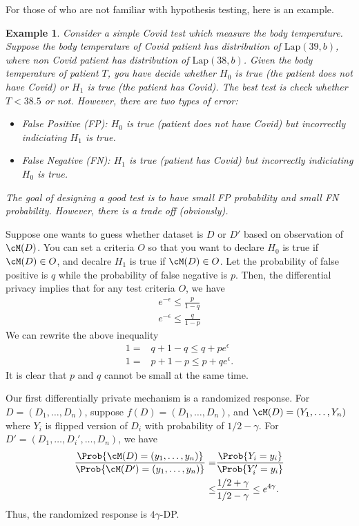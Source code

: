 \documentclass[11pt, a4paper]{article}
\newtheorem{example}{Example}
\begin{document}
For those of who are not familiar with hypothesis testing, here is an example.
\begin{example}
    Consider a simple Covid test which measure the body temperature.
    Suppose the body temperature of Covid patient has distribution of $\mbox{Lap}(39, b)$,
    where non Covid patient has distribution of $\mbox{Lap}(38, b)$.
    Given the body temperature of patient $T$, you have decide whether $H_0$ is true (the patient does not have Covid) or $H_1$ is true (the patient has Covid).
    The best test is check whether $T<38.5$ or not.
    However, there are two types of error:
    \begin{itemize}
        \item False Positive (FP): $H_0$ is true (patient does not have Covid) but incorrectly indiciating $H_1$ is true.
        \item False Negative (FN): $H_1$ is true (patient has Covid) but incorrectly indiciating $H_0$ is true.
    \end{itemize}
    The goal of designing a good test is to have small FP probability and small FN probability.
    However, there is a trade off (obviously).
\end{example}
Suppose one wants to guess whether dataset is $D$ or $D'$ based on observation of $\cM(D)$.
You can set a criteria $O$ so that you want to declare $H_0$ is true if $\cM(D) \in O$, 
and decalre $H_1$ is true if $\cM(D) \in O$.
Let the probability of false positive is $q$ while the probability of false negative is $p$.
Then, the differential privacy implies that for any test criteria $O$, we have
\begin{align}
    e^{-\epsilon} \leq \frac{p}{1-q}\\
    e^{-\epsilon} \leq \frac{q}{1-p}
\end{align}
We can rewrite the above inequality
\begin{align}
    1 =& q + 1-q \leq q+ pe^\epsilon\\
    1 =& p + 1-p \leq p+ qe^\epsilon.
\end{align}
It is clear that $p$ and $q$ cannot be small at the same time.

Our first differentially private mechanism is a randomized response.
For $D=(D_1, \dots, D_n)$, suppose $f(D) = (D_1, \dots, D_n)$, and $\cM(D) = (Y_1, \dots, Y_n)$ where $Y_i$ is flipped version of $D_i$ with probability of $1/2-\gamma$.
For $D' = (D_1, \dots, D_i', \dots, D_n)$, we have
\begin{align}
    \frac{\Prob{\cM(D) = (y_1, \dots, y_n)}}{\Prob{\cM(D') = (y_1, \dots, y_n)}}
    =& \frac{\Prob{Y_i = y_i}}{\Prob{Y_i' = y_i}}\\
    \leq& \frac{1/2+\gamma}{1/2-\gamma} \leq e^{4\gamma}.
\end{align}
Thus, the randomized response is $4\gamma$-DP.
\end{document}
